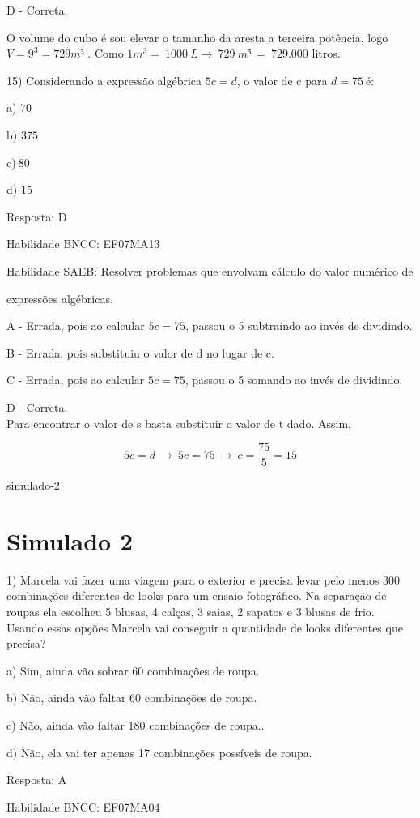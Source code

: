 {D - Correta.

O volume do cubo é sou elevar o tamanho da aresta a terceira potência,
logo \(V = 9^{3} = 729m³\) . Como
\(1m^{3} = \ 1000\ L \rightarrow \ 729\ m³\  = \ 729.000\) litros.

15) Considerando a expressão algébrica \(5c = d\), o valor de c para
\(d = 75\ \)é:

a) \(70\)

b) \(375\)

c)\(\ 80\)

d) \(15\)

Resposta: D

Habilidade BNCC: EF07MA13

Habilidade SAEB: Resolver problemas que envolvam cálculo do valor
numérico de

expressões algébricas.

A - Errada, pois ao calcular \(5c = 75\), passou o 5 subtraindo ao invés
de dividindo.

B - Errada, pois substituiu o valor de d no lugar de c.

C - Errada, pois ao calcular \(5c = 75\), passou o 5 somando ao invés de
dividindo.

D - Correta.\\
Para encontrar o valor de s basta substituir o valor de t dado. Assim,

\[5c = d\  \rightarrow \ 5c = 75\  \rightarrow \ c = \frac{75}{5} = 15\]

simulado-2}{%
\section{Simulado 2}

1) Marcela vai fazer uma viagem para o exterior e precisa levar pelo
menos 300 combinações diferentes de looks para um ensaio fotográfico. Na
separação de roupas ela escolheu 5 blusas, 4 calças, 3 saias, 2 sapatos
e 3 blusas de frio. Usando essas opções Marcela vai conseguir a
quantidade de looks diferentes que precisa?

a) Sim, ainda vão sobrar 60 combinações de roupa.

b) Não, ainda vão faltar 60 combinações de roupa.

c) Não, ainda vão faltar 180 combinações de roupa..

d) Não, ela vai ter apenas 17 combinações possíveis de roupa.

Resposta: A

Habilidade BNCC: EF07MA04

}
